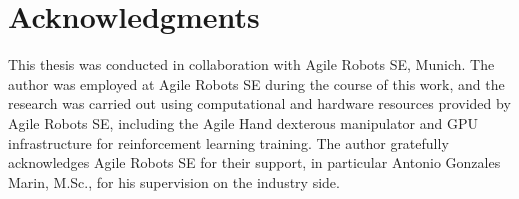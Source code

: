 \documentclass[AIRstudentthesis%
              ,optCharter%
              ,optBlackHeadings%
              ,optBlackRefs%
              ,optBiber%
              ,optBibstyleNumeric%
              ,optCenterEquations%
              ,optEnglish%
              ]{AIRlatex}
\begin{document}
%
\frontmatter%

%

%
\chapter*{Acknowledgments}%
%
This thesis was conducted in collaboration with Agile Robots SE, Munich.
The author was employed at Agile Robots SE during the course of this work, and the research was carried out using computational and hardware resources provided by Agile Robots SE, including the Agile Hand dexterous manipulator and GPU infrastructure for reinforcement learning training.
The author gratefully acknowledges Agile Robots SE for their support, in particular Antonio Gonzales Marin, M.Sc., for his supervision on the industry side.
\cleardoublepage%
%
%
%
\AIRstudentthesisPrintTableOfContents%
%
\listoffigures%
%
\cleardoublepage%
\listoftables%
%
\cleardoublepage%
%
\end{document}
